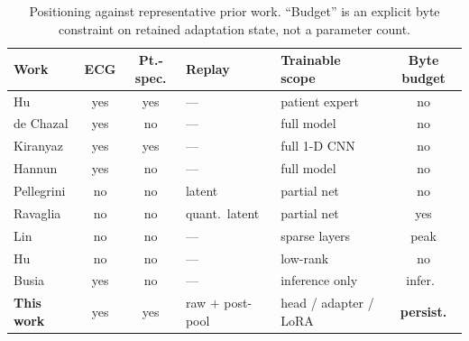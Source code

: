 \begin{table}[H]
\centering
\small
\caption{Positioning against representative prior work. ``Budget'' is an explicit
byte constraint on retained adaptation state, not a parameter count.}
\label{tab:relwork}
\setlength{\tabcolsep}{3.5pt}
\begin{tabular}{lccll@{}c@{}}
\toprule
Work & ECG & Pt.-spec. & Replay & Trainable scope & Byte budget \\
\midrule
Hu \cite{hu1997patient}                  & yes & yes & ---            & patient expert  & no \\
de Chazal \cite{dechazal2004automatic}   & yes & no  & ---            & full model      & no \\
Kiranyaz \cite{kiranyaz2016realtime}     & yes & yes & ---            & full 1-D CNN    & no \\
Hannun \cite{hannun2019cardiologist}     & yes & no  & ---            & full model      & no \\
Pellegrini \cite{pellegrini2020latent}   & no  & no  & latent         & partial net     & no \\
Ravaglia \cite{ravaglia2021tinyml}       & no  & no  & quant.\ latent & partial net     & yes \\
Lin \cite{lin2022ondevice}               & no  & no  & ---            & sparse layers   & peak \\
Hu \cite{hu2022lora}                     & no  & no  & ---            & low-rank        & no \\
Busia \cite{busia2025tiny}               & yes & no  & ---            & inference only  & infer.\ \\
\midrule
\textbf{This work} & yes & yes & raw $+$ post-pool & head / adapter / LoRA
 & \textbf{persist.} \\
\bottomrule
\end{tabular}
\end{table}
